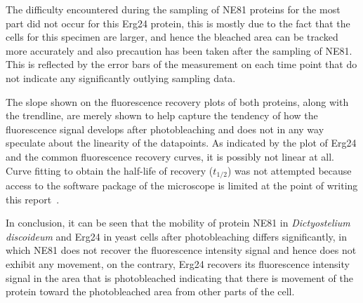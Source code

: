 The difficulty encountered during the sampling of NE81 proteins for the most part did not occur for this Erg24 protein, this is mostly due to the fact that the cells for this specimen are larger, and hence the bleached area can be tracked more accurately and also precaution has been taken after the sampling of NE81. 
This is reflected by the error bars of the measurement on each time point that do not indicate any significantly outlying sampling data.

The slope shown on the fluorescence recovery plots of both proteins, along with the trendline, are merely shown to help capture the tendency of how the fluorescence signal develops after photobleaching and does not in any way speculate about the linearity of the datapoints. 
As indicated by the plot of Erg24 and the common fluorescence recovery curves, it is possibly not linear at all. 
Curve fitting to obtain the half-life of recovery ($t_{1/2}$) was not attempted because access to the software package of the microscope is limited at the point of writing this report~\cite{LectLCI}. 
 
In conclusion, it can be seen that the mobility of protein NE81 in \textit{Dictyostelium discoideum} and Erg24 in yeast cells after photobleaching differs significantly, in which NE81 does not recover the fluorescence intensity signal and hence does not exhibit any movement, on the contrary, Erg24 recovers its fluorescence intensity signal in the area that is photobleached indicating that there is movement of the protein toward the photobleached area from other parts of the cell.



\renewcommand{\refname}{\spacedlowsmallcaps{References}} %

%


